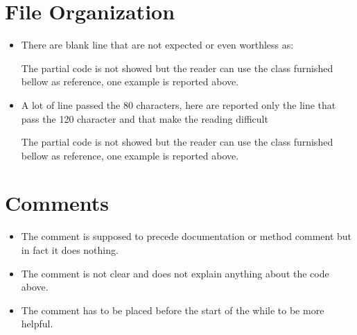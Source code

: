 \section{File Organization}
\begin{itemize}
    \begin{itemize}
      \item There are blank line that are not expected or even worthless as:
        \begin{itemize}
        \end{itemize}
        The partial code is not showed but the reader can use the class furnished bellow as reference, one example is
        reported above.
    \end{itemize}
      \begin{itemize}
        \item A lot of line passed the 80 characters, here are reported only the line that pass the 120 character
        and that make the reading difficult
          \begin{itemize}
          \end{itemize}
          The partial code is not showed but the reader can use the class furnished bellow as reference, one example is
          reported above.
      \end{itemize}
\end{itemize}
\section{Comments}
\begin{itemize}
    \begin{itemize}
      \item The comment
      is supposed to precede documentation or method comment but in fact it does nothing.
      \item The comment
        is not clear and does not explain anything about the code above.
      \item The comment
        has to be placed before the start of the while to be more helpful.
    \end{itemize}
\end{itemize}
